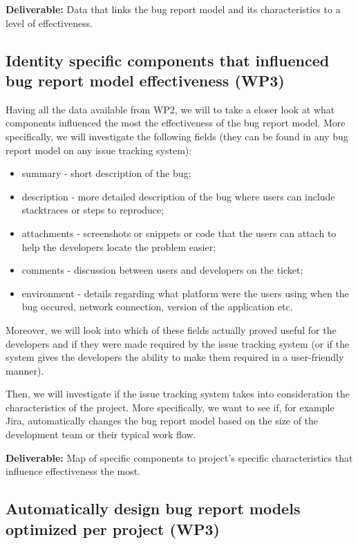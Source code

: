 \documentclass[11pt,english,twocolumn]{article}
\begin{document}
\textbf{Deliverable:} Data that links the bug report model and its characteristics to a 
level of effectiveness.

\subsection*{Identity specific components that influenced bug report model effectiveness (WP3)}

Having all the data available from WP2, we will to take a closer look at what components 
influenced the most the effectiveness of the bug report model. More specifically, we will
investigate the following fields (they can be found in any bug report model on any issue 
tracking system):
	\begin{itemize}
		\item summary - short description of the bug;
		\item description - more detailed description of the bug where users can include 
		stacktraces or steps to reproduce;
		\item attachments - screenshots or snippets or code that the users can attach to 
		help the developers locate the problem easier;
		\item comments - discussion between users and developers on the ticket;
		\item environment - details regarding what platform were the users using when the 
		bug occured, network connection, version of the application etc.
	\end{itemize}

Moreover, we will look into which of these fields actually proved useful for the developers 
and if they were made required by the issue tracking system (or if the system gives the 
developers the ability to make them required in a user-friendly manner). 

Then, we will investigate if the issue tracking system takes into consideration the characteristics
of the project. More specifically, we want to see if, for example Jira, automatically changes 
the bug report model based on the size of the development team or their typical work flow. 

\textbf{Deliverable:} Map of specific components to project's specific characteristics that
influence effectiveness the most.

\subsection*{Automatically design bug report models optimized per project (WP3)}
\end{document}

